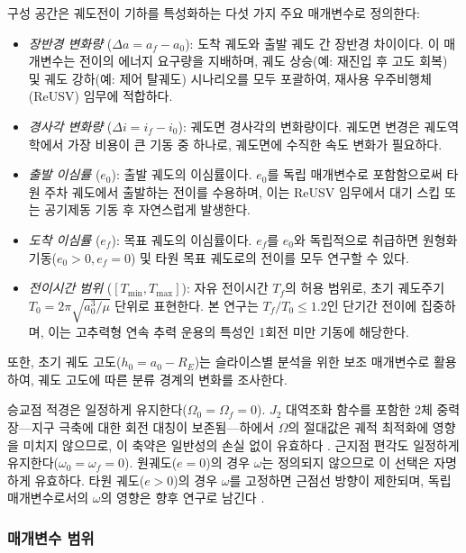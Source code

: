 구성 공간은 궤도전이 기하를 특성화하는 다섯 가지 주요 매개변수로 정의한다:

\begin{itemize}
\item \textit{장반경 변화량} ($\Delta a = a_f - a_0$): 도착 궤도와 출발 궤도 간 장반경 차이이다. 이 매개변수는 전이의 에너지 요구량을 지배하며, 궤도 상승(예: 재진입 후 고도 회복) 및 궤도 강하(예: 제어 탈궤도) 시나리오를 모두 포괄하여, 재사용 우주비행체(ReUSV) 임무에 적합하다.

\item \textit{경사각 변화량} ($\Delta i = i_f - i_0$): 궤도면 경사각의 변화량이다. 궤도면 변경은 궤도역학에서 가장 비용이 큰 기동 중 하나로, 궤도면에 수직한 속도 변화가 필요하다.

\item \textit{출발 이심률} ($e_0$): 출발 궤도의 이심률이다. $e_0$를 독립 매개변수로 포함함으로써 타원 주차 궤도에서 출발하는 전이를 수용하며, 이는 ReUSV 임무에서 대기 스킵 또는 공기제동 기동 후 자연스럽게 발생한다.

\item \textit{도착 이심률} ($e_f$): 목표 궤도의 이심률이다. $e_f$를 $e_0$와 독립적으로 취급하면 원형화 기동($e_0 > 0, e_f = 0$) 및 타원 목표 궤도로의 전이를 모두 연구할 수 있다.

\item \textit{전이시간 범위} ($[T_{\min}, T_{\max}]$): 자유 전이시간 $T_f$의 허용 범위로, 초기 궤도주기 $T_0 = 2\pi\sqrt{a_0^3/\mu}$ 단위로 표현한다. 본 연구는 $T_f/T_0 \leq 1.2$인 단기간 전이에 집중하며, 이는 고추력형 연속 추력 운용의 특성인 1회전 미만 기동에 해당한다.
\end{itemize}

또한, 초기 궤도 고도($h_0 = a_0 - R_E$)는 슬라이스별 분석을 위한 보조 매개변수로 활용하여, 궤도 고도에 따른 분류 경계의 변화를 조사한다.

승교점 적경은 일정하게 유지한다($\Omega_0 = \Omega_f = 0$). $J_2$ 대역조화 함수를 포함한 2체 중력장---지구 극축에 대한 회전 대칭이 보존됨---하에서 $\Omega$의 절대값은 궤적 최적화에 영향을 미치지 않으므로, 이 축약은 일반성의 손실 없이 유효하다 \citep{Vallado2013}. 근지점 편각도 일정하게 유지한다($\omega_0 = \omega_f = 0$). 원궤도($e = 0$)의 경우 $\omega$는 정의되지 않으므로 이 선택은 자명하게 유효하다. 타원 궤도($e > 0$)의 경우 $\omega$를 고정하면 근점선 방향이 제한되며, 독립 매개변수로서의 $\omega$의 영향은 향후 연구로 남긴다 \citep{Curtis2020}.

\subsubsection{매개변수 범위}

